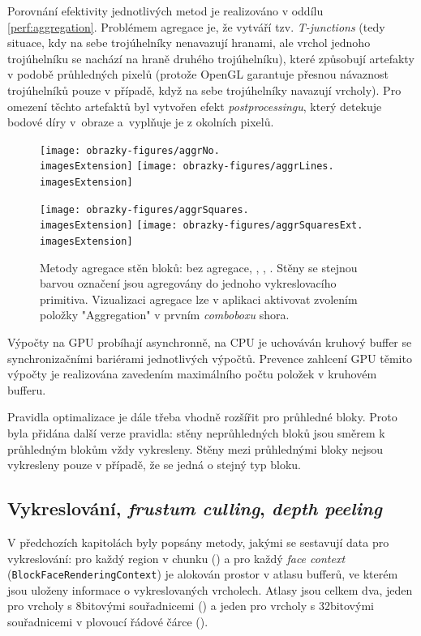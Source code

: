 Porovnání efektivity jednotlivých metod je realizováno v oddílu \ref{perf:aggregation}. Problémem agregace je, že vytváří tzv. \textit{T-junctions} (tedy situace, kdy na sebe trojúhelníky nenavazují hranami, ale vrchol jednoho trojúhelníku se nachází na hraně druhého trojúhelníku), které způsobují artefakty v podobě průhledných pixelů (protože OpenGL garantuje přesnou návaznost trojúhelníků pouze v případě, když na sebe trojúhelníky navazují vrcholy). Pro omezení těchto artefaktů byl vytvořen efekt \textit{postprocessingu}, který detekuje bodové díry v~obraze a~vyplňuje je z okolních pixelů.

\begin{figure}[H]
	\centering
	\texttt{[image: obrazky-figures/aggrNo.\\imagesExtension]}
	\hfill
	\texttt{[image: obrazky-figures/aggrLines.\\imagesExtension]}

	\vspace{2.5mm}

	\texttt{[image: obrazky-figures/aggrSquares.\\imagesExtension]}
	\hfill
	\texttt{[image: obrazky-figures/aggrSquaresExt.\\imagesExtension]}
	\caption{Metody agregace stěn bloků: bez agregace, , , . Stěny se stejnou barvou označení jsou agregovány do jednoho vykreslovacího primitiva. Vizualizaci agregace lze v aplikaci aktivovat zvolením položky "Aggregation" v prvním \textit{comboboxu} shora.}
\end{figure}

Výpočty na GPU probíhají asynchronně, na CPU je uchováván kruhový buffer se synchronizačními bariérami jednotlivých výpočtů. Prevence zahlcení GPU těmito výpočty je realizována zavedením maximálního počtu položek v kruhovém bufferu.

Pravidla optimalizace je dále třeba vhodně rozšířit pro průhledné bloky. Proto byla přidána další verze pravidla: stěny neprůhledných bloků jsou směrem k průhledným blokům vždy vykresleny. Stěny mezi průhlednými bloky nejsou vykresleny pouze v případě, že se jedná o stejný typ bloku.

\subsection{Vykreslování, \textit{frustum culling}, \textit{depth peeling}}
V předchozích kapitolách byly popsány metody, jakými se sestavují data pro vykreslování: pro každý region v chunku () a pro každý \textit{face context} (\texttt{BlockFace\-Rendering\-Context}) je alokován prostor v atlasu bufferů, ve kterém jsou uloženy informace o vykreslovaných vrcholech. Atlasy jsou celkem dva, jeden pro vrcholy s 8bitovými souřadnicemi () a jeden pro vrcholy s 32bitovými souřadnicemi v plovoucí řádové čárce ().

